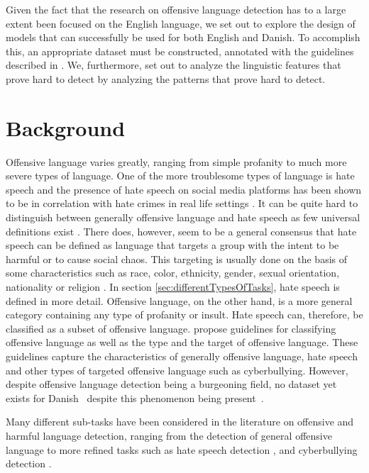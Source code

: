 \documentclass{article}
\begin{document}
Given the fact that the research on offensive language detection has to a large extent been focused on the English language, we set out to explore the design of models that can successfully be used for both English and Danish. To accomplish this, an appropriate dataset must be constructed, annotated with the guidelines described in \cite{zampieri2019predicting}. We, furthermore, set out to analyze the linguistic features that prove hard to detect by analyzing the patterns that prove hard to detect.  



\section{Background}
\label{ch:relatedWork}


Offensive language varies greatly, ranging from simple profanity to much more severe types of language. One of the more troublesome types of language is hate speech and the presence of hate speech on social media platforms has been shown to be in correlation with hate crimes in real life settings \cite{muller2018fanning}. It can be quite hard to distinguish between generally offensive language and hate speech as few universal definitions exist \cite{davidson2017automated}. There does, however, seem to be a general consensus that hate speech can be defined as language that targets a group with the intent to be harmful or to cause social chaos. This targeting is usually done on the basis of some characteristics such as race, color, ethnicity, gender, sexual orientation, nationality or religion \cite{schmidt2017survey}. In section \ref{sec:differentTypesOfTasks}, hate speech is defined in more detail. Offensive language, on the other hand, is a more general category containing any type of profanity or insult. Hate speech can, therefore, be classified as a subset of offensive language.  \cite{zampieri2019predicting} propose guidelines for classifying offensive language as well as the type and the target of offensive language. These guidelines capture the characteristics of generally offensive language, hate speech and other types of targeted offensive language such as cyberbullying. However, despite offensive language detection being a burgeoning field, no dataset yet exists for Danish~\cite{lacunae} despite this phenomenon being present~\cite{mm3}.

\label{sec:differentTypesOfTasks}
Many different sub-tasks have been considered in the literature on offensive and harmful language detection, ranging from the detection of general offensive language to more refined tasks such as hate speech detection \cite{davidson2017automated}, and cyberbullying detection \cite{guidelinesCyberbullying}.
\end{document}
